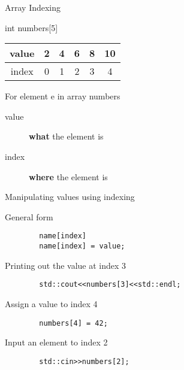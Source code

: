 \documentclass[xcolor={dvipsnames}]{beamer}
\begin{document}
\begin{frame}{Array Indexing}
	\begin{block}{int numbers[5]}
	\begin{table}
	\Huge
	\begin{tabular}{|c|c|c|c|c|c|}
	\hline
	value & 2  & 4 & 6 & 8 & 10\\
	\hline
	{\color{red} index} &  {\color{red} 0}   &  {\color{red} 1}  &   {\color{red} 2}  &  {\color{red} 3}  &  {\color{red} 4} \\
	\hline
	\end{tabular}
	\end{table}
	\end{block}
	\pause
	\begin{block}{For element e in array numbers}
		\begin{description}
			\item[value] \textbf{what} the element is
			\item[index] \textbf{where} the element is 
		\end{description}
	\end{block}
\end{frame}

\begin{frame}[fragile]{Manipulating values using indexing}
	\begin{block}{General form}
	\begin{verbatim}
		name[index]
		name[index] = value;
	\end{verbatim}
	\end{block}
	\pause
	\begin{block}{Printing out the value at index 3}
	\begin{verbatim}
		std::cout<<numbers[3]<<std::endl;
	\end{verbatim}
	\end{block}
	\pause
	\begin{block}{Assign a value to index 4}
	\begin{verbatim}
		numbers[4] = 42;
	\end{verbatim}
	\end{block}
\pause
	\begin{block}{Input an element to index 2}
	\begin{verbatim}
		std::cin>>numbers[2];
	\end{verbatim}
	\end{block}
\end{frame}
\end{document}

